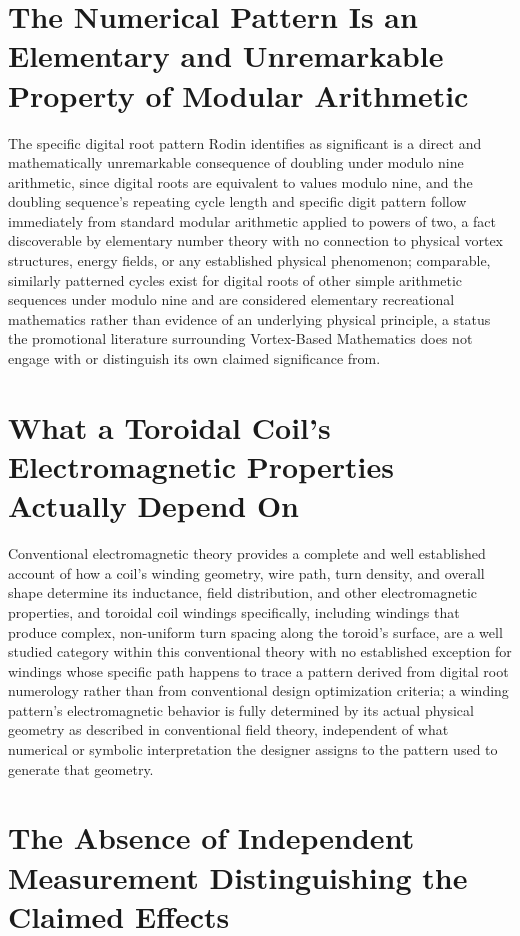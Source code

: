 \documentclass[11pt]{article}
\begin{document}
\section{The Numerical Pattern Is an Elementary and Unremarkable Property of Modular Arithmetic}

The specific digital root pattern Rodin identifies as significant is a direct and mathematically unremarkable consequence of doubling under modulo nine arithmetic, since digital roots are equivalent to values modulo nine, and the doubling sequence's repeating cycle length and specific digit pattern follow immediately from standard modular arithmetic applied to powers of two, a fact discoverable by elementary number theory with no connection to physical vortex structures, energy fields, or any established physical phenomenon; comparable, similarly patterned cycles exist for digital roots of other simple arithmetic sequences under modulo nine and are considered elementary recreational mathematics rather than evidence of an underlying physical principle, a status the promotional literature surrounding Vortex-Based Mathematics does not engage with or distinguish its own claimed significance from.

\section{What a Toroidal Coil's Electromagnetic Properties Actually Depend On}

Conventional electromagnetic theory provides a complete and well established account of how a coil's winding geometry, wire path, turn density, and overall shape determine its inductance, field distribution, and other electromagnetic properties, and toroidal coil windings specifically, including windings that produce complex, non-uniform turn spacing along the toroid's surface, are a well studied category within this conventional theory with no established exception for windings whose specific path happens to trace a pattern derived from digital root numerology rather than from conventional design optimization criteria; a winding pattern's electromagnetic behavior is fully determined by its actual physical geometry as described in conventional field theory, independent of what numerical or symbolic interpretation the designer assigns to the pattern used to generate that geometry.

\section{The Absence of Independent Measurement Distinguishing the Claimed Effects}
\end{document}
